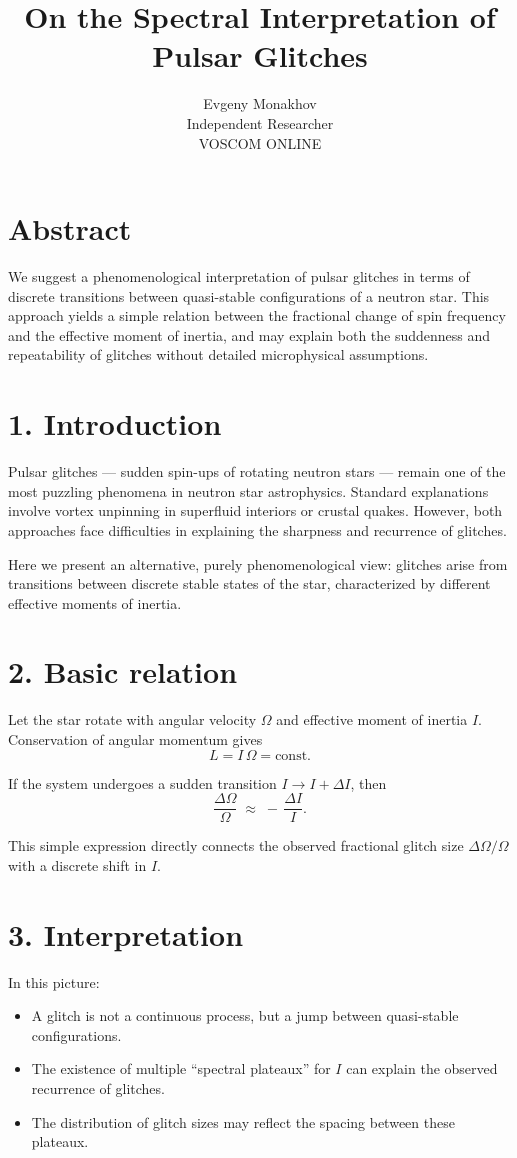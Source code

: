 \documentclass[a4paper,12pt]{article}
\begin{document}
\title{On the Spectral Interpretation of Pulsar Glitches}
\author{Evgeny Monakhov \\ Independent Researcher \\ VOSCOM ONLINE}
\date{}
\maketitle

\section*{Abstract}
We suggest a phenomenological interpretation of pulsar glitches in terms of discrete transitions between quasi-stable configurations of a neutron star. This approach yields a simple relation between the fractional change of spin frequency and the effective moment of inertia, and may explain both the suddenness and repeatability of glitches without detailed microphysical assumptions.

\section*{1. Introduction}
Pulsar glitches --- sudden spin-ups of rotating neutron stars --- remain one of the most puzzling phenomena in neutron star astrophysics. Standard explanations involve vortex unpinning in superfluid interiors or crustal quakes. However, both approaches face difficulties in explaining the sharpness and recurrence of glitches.

Here we present an alternative, purely phenomenological view: glitches arise from transitions between discrete stable states of the star, characterized by different effective moments of inertia.

\section*{2. Basic relation}
Let the star rotate with angular velocity $\Omega$ and effective moment of inertia $I$. Conservation of angular momentum gives
\[
L = I \, \Omega = \text{const}.
\]

If the system undergoes a sudden transition $I \to I + \Delta I$, then
\[
\frac{\Delta \Omega}{\Omega} \;\approx\; -\, \frac{\Delta I}{I}.
\]

This simple expression directly connects the observed fractional glitch size $\Delta \Omega / \Omega$ with a discrete shift in $I$.

\section*{3. Interpretation}
In this picture:
\begin{itemize}
  \item A glitch is not a continuous process, but a jump between quasi-stable configurations.
  \item The existence of multiple ``spectral plateaux'' for $I$ can explain the observed recurrence of glitches.
  \item The distribution of glitch sizes may reflect the spacing between these plateaux.
\end{itemize}
\end{document}
